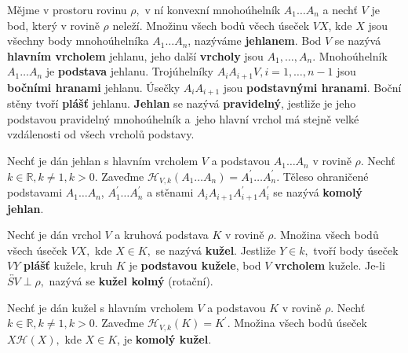 \begin{definition}
Mějme v prostoru rovinu $\rho,$ v ní konvexní mnohoúhelník $A_1\dots A_n$ a nechť
$V$ je bod, který v rovině $\rho$ neleží. Množinu všech bodů včech úseček $VX$, kde $X$ jsou všechny body
mnohoúhelníka $A_1\dots A_n$, nazýváme \textbf{jehlanem}. Bod $V$ se nazývá
\textbf{hlavním vrcholem} jehlanu, jeho další \textbf{vrcholy} jsou $A_1,\dots,A_n$.
Mnohoúhelník $A_1\dots A_n$ je \textbf{podstava} jehlanu. Trojúhelníky
$A_iA_{i+1}V, i=1,\dots,n-1$ jsou \textbf{bočními hranami} jehlanu.
Úsečky $A_iA_{i+1}$ jsou \textbf{podstavnými hranami}. Boční stěny tvoří \textbf{plášť}
jehlanu. \textbf{Jehlan} se nazývá \textbf{pravidelný}, jestliže je jeho podstavou
pravidelný mnohoúhelník a~jeho hlavní vrchol má stejně velké vzdálenosti od
všech vrcholů podstavy.
\end{definition}

\begin{definition}
    Nechť je dán jehlan s hlavním vrcholem $V$ a podstavou $A_1\dots A_n$ v rovině
    $\rho.$ Nechť $k \in \mathbb R, k \ne 1, k >0.$ Zaveďme $\mathscr H_{V,k}(A_1\dots A_n)
    =A_1^\prime\dots A_n^\prime.$ Těleso ohraničené podstavami $A_1\dots A_n$,
    $A_1^\prime\dots A_n^\prime$ a stěnami $A_iA_{i+1}A_{i+1}^\prime A_{i}^\prime$ se
    nazývá \textbf{komolý jehlan}.
\end{definition}

\begin{definition}
    Nechť je dán vrchol $V$ a kruhová podstava $K$ v rovině
    $\rho.$ Množina všech bodů všech úseček $VX,$ kde $X\in K,$ se nazývá \textbf{kužel}.
    Jestliže $Y\in k,$ tvoří body úseček $VY$ \textbf{plášť} kužele, kruh $K$ je
    \textbf{podstavou kužele}, bod $V$ \textbf{vrcholem} kužele. Je-li
    $\overleftrightarrow{SV}\perp \rho,$ nazývá se \textbf{kužel kolmý} (rotační).
\end{definition}

\begin{definition}
Nechť je dán kužel s hlavním vrcholem $V$ a podstavou $K$ v rovině
$\rho.$ Nechť $k \in \mathbb R, k \ne 1, k >0.$ Zaveďme $\mathscr H_{V,k}(K)
=K^\prime.$ Množina všech bodů úseček $X\mathscr H(X),$ kde $X\in K$, je
\textbf{komolý kužel}.
\end{definition}

